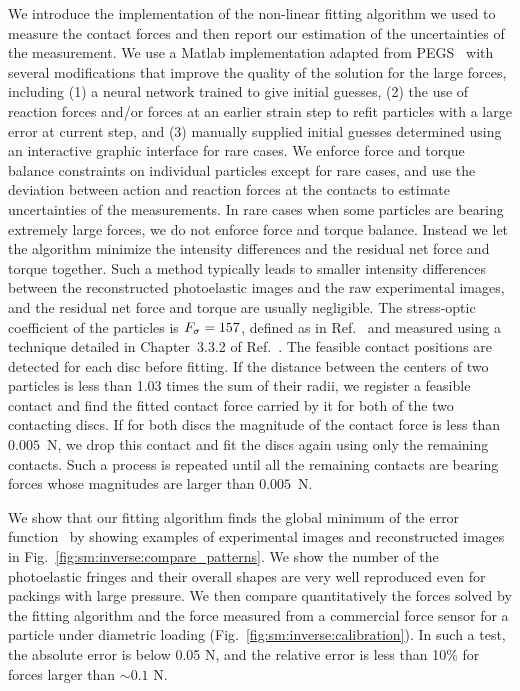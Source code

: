 \documentclass[twocolumn,showkeys,superscriptaddress,preprintnumbers,amsmath,amssymb,showpacs,prx,longbibliography]{revtex4-2}
\begin{document}
We introduce the implementation of the non-linear fitting algorithm we used to measure the contact forces and then report our estimation of the uncertainties of the measurement. We use a Matlab implementation adapted from PEGS~\cite{Daniels2017_rsi} with several modifications that improve the quality of the solution for the large forces, including (1) a neural network trained to give initial guesses, (2) the use of reaction forces and/or forces at an earlier strain step to refit particles with a large error at current step, and (3) manually supplied initial guesses determined using an interactive graphic interface for rare cases.  We enforce force and torque balance constraints on individual particles except for rare cases, and use the deviation between action and reaction forces at the contacts to estimate uncertainties of the measurements. In rare cases when some particles are bearing extremely large forces, we do not enforce force and torque balance. Instead we let the algorithm minimize the intensity differences and the residual net force and torque together. Such a method typically leads to smaller intensity differences between the reconstructed photoelastic images and the raw experimental images, and the residual net force and torque are usually negligible. The stress-optic coefficient of the particles is $F_{\rm \sigma}=157$, defined as in Ref.~\cite{Daniels2017_rsi} and measured using a technique detailed in Chapter~3.3.2 of Ref.~\cite{zhao2020_phd}. The feasible contact positions are detected for each disc before fitting. If the distance between the centers of two particles is less than 1.03 times the sum of their radii, we register a feasible contact and find the fitted contact force carried by it for both of the two contacting discs. If for both discs the magnitude of the contact force is less than $0.005$~N, we drop this contact and fit the discs again using only the remaining contacts. Such a process is repeated until all the remaining contacts are bearing forces whose magnitudes are larger than $0.005$~N.

We show that our fitting algorithm finds the global minimum of the error function~\cite{majmudar2005_nature,Daniels2017_rsi,zadeh2019_gm} by showing examples of experimental images and reconstructed images in Fig.~\ref{fig:sm:inverse:compare_patterns}. We show the number of the photoelastic fringes and their overall shapes are very well reproduced even for packings with large pressure. We then compare quantitatively the forces solved by the fitting algorithm and the force measured from a commercial force sensor for a particle under diametric loading (Fig.~\ref{fig:sm:inverse:calibration}). In such a test, the absolute error is below 0.05 N, and the relative error is less than 10\% for forces larger than $\sim 0.1$ N. 
\end{document}

